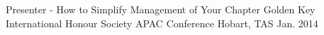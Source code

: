 

\begin{cventries}

  \cventry
    {Presenter - How to Simplify Management of Your Chapter} %
    {Golden Key International Honour Society APAC Conference} %
    {Hobart, TAS} %
    {Jan. 2014} %
    {}

\end{cventries}
